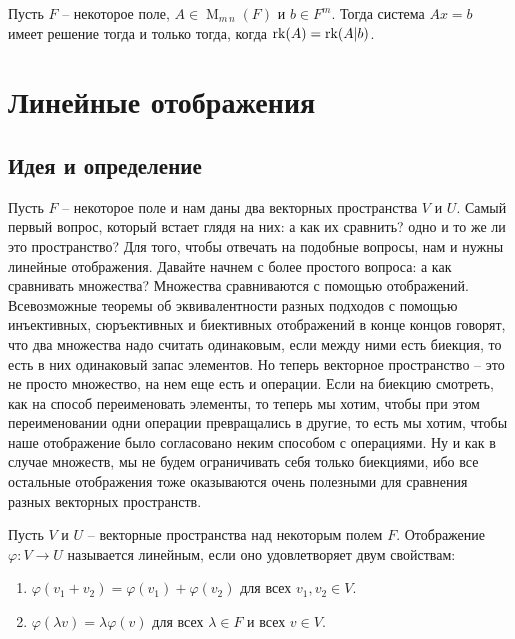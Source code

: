 \begin{claim}
Пусть $F$ -- некоторое поле, $A\in \operatorname{M}_{m\,n}(F)$ и $b\in F^m$. Тогда система $Ax = b$ имеет решение тогда и только тогда, когда $\operatorname{rk}(A) = \operatorname{rk}(A|b)$.
\end{claim}


\newpage
\section{Линейные отображения}

\subsection{Идея и определение}

Пусть $F$ -- некоторое поле и нам даны два векторных пространства $V$ и $U$. Самый первый вопрос, который встает глядя на них: а как их сравнить? одно и то же ли это пространство? Для того, чтобы отвечать на подобные вопросы, нам и нужны линейные отображения. Давайте начнем с более простого вопроса: а как сравнивать множества? Множества сравниваются с помощью отображений. Всевозможные теоремы об эквивалентности разных подходов с помощью инъективных, сюръективных и биективных отображений в конце концов говорят, что два множества надо считать одинаковым, если между ними есть биекция, то есть в них одинаковый запас элементов. Но теперь векторное пространство -- это не просто множество, на нем еще есть и операции. Если на биекцию смотреть, как на способ переименовать элементы, то теперь мы хотим, чтобы при этом переименовании одни операции превращались в другие, то есть мы хотим, чтобы наше отображение было согласовано неким способом с операциями. Ну и как в случае множеств, мы не будем ограничивать себя только биекциями, ибо все остальные отображения тоже оказываются очень полезными для сравнения разных векторных пространств.

\begin{definition}
Пусть $V$ и $U$ -- векторные пространства над некоторым полем $F$. Отображение $\varphi\colon V\to U$ называется линейным, если оно удовлетворяет двум свойствам:
\begin{enumerate}
\item $\varphi(v_1 + v_2) = \varphi(v_1) + \varphi(v_2)$ для всех $v_1,v_2\in V$.
\item $\varphi(\lambda v) = \lambda \varphi(v)$ для всех $\lambda \in F$ и всех $v\in V$.
\end{enumerate}
\end{definition}

